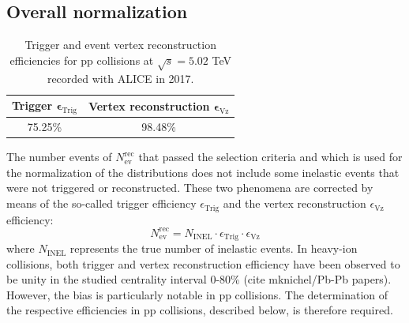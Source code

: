 \documentclass[12pt,a4paper]{report}
\begin{document}
\subsection{Overall normalization}
\label{Norm}
\begin{table}[H]
\centering
\renewcommand{\arraystretch}{1.5}
\begin{tabular}{|c|c|}
\toprule
\rowcolor{headerBlue}  \textbf{Trigger} $\boldsymbol \epsilon_\text{Trig}$ &  \textbf{Vertex reconstruction} $\boldsymbol \epsilon_\text{Vz}$\\
\hline
75.25\%	&	98.48\%		 \\
\bottomrule
\end{tabular}
\caption{Trigger and event vertex reconstruction efficiencies for pp collisions at $\sqrt{s} = 5.02$ TeV recorded with ALICE in 2017.}
\label{tab:effs}
\end{table} 
The number events of $N_\text{ev}^\text{rec}$ that passed the selection criteria and which is used for the normalization of the \pt distributions does not include some inelastic events that were not triggered or reconstructed. These two phenomena are corrected by means of the so-called trigger efficiency $\epsilon_\text{Trig}$ and the vertex reconstruction $\epsilon_\text{Vz}$ efficiency:
\begin{equation}
N_\text{ev}^\text{rec} = N_\text{INEL}\cdot \epsilon_\text{Trig} \cdot \epsilon_\text{Vz}
\end{equation}
where $N_\text{INEL}$ represents the true number of inelastic events. In heavy-ion collisions, both trigger and vertex reconstruction efficiency have been observed to be unity in the studied centrality interval 0-80\% (cite mknichel/Pb-Pb papers). However, the bias is particularly notable in pp collisions. The determination of the respective efficiencies in pp collisions, described below, is therefore required.
\end{document}
